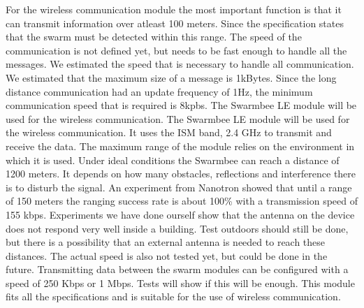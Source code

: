\documentclass[10pt,a4paper]{article}
\begin{document}
For the wireless communication module the most important function is that it can transmit information over atleast 100 meters. Since the specification states that the swarm must be detected within this range. The speed of the communication is not defined yet, but needs to be fast enough to handle all the messages. We estimated the speed that is necessary to handle all communication. We estimated that the maximum size of a message is 1kBytes. Since the long distance communication had an update frequency of 1Hz, the minimum communication speed that is required is 8kpbs. The Swarmbee LE module will be used for the wireless communication. The Swarmbee LE module will be used for the wireless communication. It uses the ISM band, 2.4 GHz to transmit and receive the data. The maximum range of the module relies on the environment in which it is used. Under ideal conditions the Swarmbee can reach a distance of 1200 meters. It depends on how many obstacles, reflections and interference there is to disturb the signal. An experiment from Nanotron showed that until a range of 150 meters the ranging success rate is about 100\% with a transmission speed of 155 kbps. Experiments we have done ourself show that the antenna on the device does not respond very well inside a building. Test outdoors should still be done, but there is a possibility that an external antenna is needed to reach these distances. The actual speed is also not tested yet, but could be done in the future. Transmitting data between the swarm modules can be configured with a speed of 250 Kbps or 1 Mbps. Tests will show if this will be enough. This module fits all the specifications and is suitable for the use of wireless communication.
\end{document}
